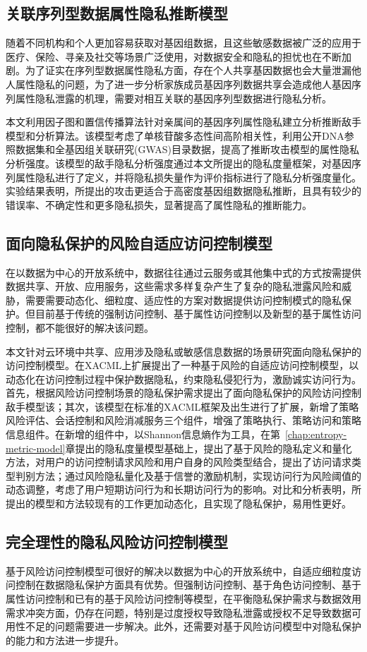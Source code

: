 \subsection{关联序列型数据属性隐私推断模型}

随着不同机构和个人更加容易获取对基因组数据，且这些敏感数据被广泛的应用于医疗、保险、寻亲及社交等场景广泛使用，对数据安全和隐私的担忧也在不断加剧。为了证实在序列型数据属性隐私方面，存在个人共享基因数据也会大量泄漏他人属性隐私的问题，为了进一步分析家族成员基因序列数据共享会造成他人基因序列属性隐私泄露的机理，需要对相互关联的基因序列型数据进行隐私分析。

本文利用因子图和置信传播算法针对亲属间的基因序列属性隐私建立分析推断敌手模型和分析算法。该模型考虑了单核苷酸多态性间高阶相关性，利用公开DNA参照数据集和全基因组关联研究(GWAS)目录数据，提高了推断攻击模型的属性隐私分析强度。该模型的敌手隐私分析强度通过本文所提出的隐私度量框架，对基因序列属性隐私进行了定义，并将隐私损失量作为评价指标进行了隐私分析强度量化。实验结果表明，所提出的攻击更适合于高密度基因组数据隐私推断，且具有较少的错误率、不确定性和更多隐私损失，显著提高了属性隐私的推断能力。

\subsection{面向隐私保护的风险自适应访问控制模型}
在以数据为中心的开放系统中，数据往往通过云服务或其他集中式的方式按需提供数据共享、开放、应用服务，这些需求多样复杂产生了复杂的隐私泄露风险和威胁，需要需要动态化、细粒度、适应性的方案对数据提供访问控制模式的隐私保护。但目前基于传统的强制访问控制、基于属性访问控制以及新型的基于属性访问控制，都不能很好的解决该问题。

本文针对云环境中共享、应用涉及隐私或敏感信息数据的场景研究面向隐私保护的访问控制模型。在XACML上扩展提出了一种基于风险的自适应访问控制模型，以动态化在访问控制过程中保护数据隐私，约束隐私侵犯行为，激励诚实访问行为。首先，根据风险访问控制场景的隐私保护需求提出了面向隐私保护的风险访问控制敌手模型该；其次，该模型在标准的XACML框架及出生进行了扩展，新增了策略风险评估、会话控制和风险消减服务三个组件，增强了策略执行、策略访问和策略信息组件。在新增的组件中，以Shannon信息熵作为工具，在第~\ref{chap:entropy-metric-model}章提出的隐私度量模型基础上，提出了基于风险的隐私定义和量化方法，对用户的访问控制请求风险和用户自身的风险类型结合，提出了访问请求类型判别方法；通过风险隐私量化及基于信誉的激励机制，实现访问行为风险阈值的动态调整，考虑了用户短期访问行为和长期访问行为的影响。对比和分析表明，所提出的模型和方法较现有的工作更加动态化，且实现了隐私保护，易用性更好。
\subsection{完全理性的隐私风险访问控制模型}
基于风险访问控制模型可很好的解决以数据为中心的开放系统中，自适应细粒度访问控制在数据隐私保护方面具有优势。但强制访问控制、基于角色访问控制、基于属性访问控制和已有的基于风险访问控制等模型，在平衡隐私保护需求与数据效用需求冲突方面，仍存在问题，特别是过度授权导致隐私泄露或授权不足导致数据可用性不足的问题需要进一步解决。此外，还需要对基于风险访问模型中对隐私保护的能力和方法进一步提升。

